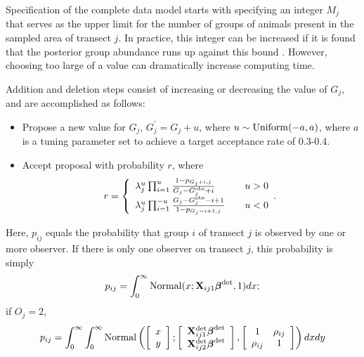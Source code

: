 \documentclass[10pt]{article}
\begin{document}
Specification of the complete data model starts with specifying an integer $M_j$ that serves as the upper limit for the number of groups of animals present in the sampled area of transect $j$. In practice, this integer can be increased if it is found that the posterior group abundance runs up against this bound \cite{DurbanElston2005,RoyleEtAl2007b}. However, choosing too large of a value can dramatically increase computing time.

Addition and deletion steps consist of increasing or decreasing the value of $G_j$, and are accomplished as follows:
\begin{itemize}
    \item Propose a new value for $G_j$, $G_j^\prime=G_j+u$, where
    $u\sim {\rm Uniform}(-a,a)$, where $a$ is a tuning parameter set to achieve a target acceptance rate of 0.3-0.4.
    \item Accept proposal with probability $r$, where
    $$
    r= \left\{ \begin{array}{lll}
				\lambda_j^u \prod_{i=1}^u
                \frac{1-p_{G_j+i,j}}{G_j-G_j^{\rm obs}+i}& & u>0\\
			    \lambda_j^u \prod_{i=1}^{-u}
                \frac{G_j-G_j^{\rm obs}-i+1}{
                1-p_{G_j-i+1,j}}& & u<0
		\end{array}. \right.
    $$
\end{itemize}
    Here, $p_{ij}$ equals the probability that group $i$ of transect $j$ is observed by one or more observer.  If there is only one observer on transect $j$, this probability is simply $$
      p_{ij} = \int_0^\infty {\rm Normal}(x;{\bf X}_{ij1}\boldsymbol{\beta}^{\rm det},1)dx;
    $$
    if $O_j=2$,
    $$
      p_{ij} = \int_0^\infty \int_0^\infty {\rm Normal}
        \left( \left[ \begin{array}{c}
				x\\
				y
		\end{array} \right]; \left[
        \begin{array}{c}
				{\bf X}_{ij1}^{\rm det} \boldsymbol{\beta}^{\rm
                det}\\
				{\bf X}_{ij2}^{\rm det} \boldsymbol{\beta}^{\rm
                det}
		\end{array}\right],
        \left[ \begin{array}{cc}
            1 & \rho_{ij} \\
            \rho_{ij} & 1
        \end{array} \right]
        \right) dx dy
    $$
\end{document}
